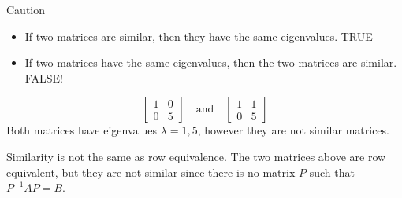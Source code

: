 \documentclass[xcolor=dvipsnames,aspectratio=169,t]{beamer}
\begin{document}
\begin{frame}{Caution}
  \medskip

  \begin{itemize} 
  \item If two matrices are similar, then they have the same eigenvalues. \alert{TRUE}
  \medskip
  \pause
  \item If two matrices have the same eigenvalues, then the two matrices are similar.
  \pause
  \alert{FALSE!}
  \end{itemize}
  \bigskip

  \begin{example}
  \[ \begin{bmatrix} 1 & 0 \\ 0 & 5 \end{bmatrix} \quad \mbox{and} \quad \begin{bmatrix} 1 & 1 \\ 0 & 5 \end{bmatrix} \]
  Both matrices have eigenvalues $\lambda = 1, 5$, however they are \alert{not similar} matrices.
  \end{example}
  \vspace*{1.5em}

  Similarity is \alert{not} the same as row equivalence.
  The two matrices above are row equivalent, but they are not similar since there is no matrix $P$ such that $P^{-1}AP=B$.
\end{frame}
\end{document}
